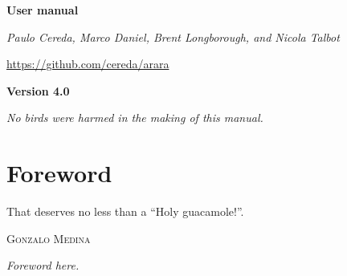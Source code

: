 \documentclass[a4paper,twoside,12pt]{memoir}
\newcommand{\araraversion}{4.0}
\begin{document}
\begin{titlingpage}
\vspace*{2em}

\begin{center}

\vspace{2em}

\scalebox{10.5}{\arara}

\vspace{1em}

{\Huge\slogan}

\vspace{6em}

\begin{tcolorbox}[
  boxrule=0pt,
  colback=araracolour,
  top=1em,
  bottom=1em
]
  \color{white}
  \centering
  \Huge
  \sffamily
  \bfseries User manual
\end{tcolorbox}

\vspace{6em}

{\large\em Paulo Cereda, Marco Daniel, Brent Longborough, and Nicola Talbot}

\vspace{2em}

\url{https://github.com/cereda/arara}

\vfill

{\color{araracolour}
\LARGE
\sffamily
\bfseries
Version \araraversion}

\end{center}
\end{titlingpage}

\pagestyle{headings} 
\frontmatter
\nouppercaseheads

\cleardoublepage

\vspace*{25em}

\begin{flushright}
\em No birds were harmed in the making of this manual.
\end{flushright}

\chapter*{Foreword}
\label{chap:foreword}

\epigraph{That deserves no less than a ``Holy guacamole!''.}{\textsc{Gonzalo Medina}}

\emph{Foreword here.}
\end{document}
